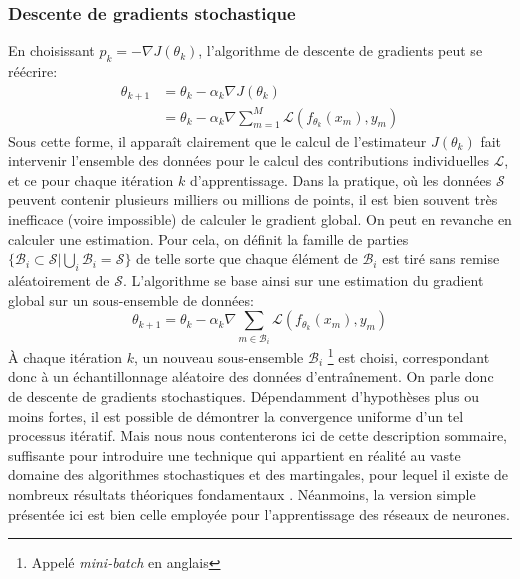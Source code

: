 \subsubsection{Descente de gradients stochastique}
En choisissant $p_k = -\nabla J(\theta_k)$, l'algorithme de descente de gradients peut se réécrire:
\begin{align}
	\theta_{k+1} &= \theta_{k} - \alpha_k \nabla J(\theta_k) \\
	&= \theta_{k} - \alpha_k \nabla \sum_{m=1}^{M} \mathcal{L}(f_{\theta_k}(x_m), y_m)
\end{align}
Sous cette forme, il apparaît clairement que le calcul de l'estimateur $J(\theta_k)$ fait intervenir l'ensemble des données pour le calcul des contributions individuelles $\mathcal{L}$, et ce pour chaque itération $k$ d'apprentissage. Dans la pratique, où les données $\mathcal{S}$ peuvent contenir plusieurs milliers ou millions de points, il est bien souvent très inefficace (voire impossible) de calculer le gradient global. On peut en revanche en calculer une estimation. Pour cela, on définit la famille de parties $\{\mathcal{B}_i \subset \mathcal{S} | \bigcup_i \mathcal{B}_i = \mathcal{S} \} $ de telle sorte que chaque élément de $\mathcal{B}_i$ est tiré sans remise aléatoirement de $\mathcal{S}$. L'algorithme se base ainsi sur une estimation du gradient global sur un sous-ensemble de données:
\begin{equation}
	\theta_{k+1} = \theta_{k} - \alpha_k \nabla \sum_{m \in \mathcal{B}_i}\mathcal{L}(f_{\theta_k}(x_m), y_m)
\end{equation} 
À chaque itération $k$, un nouveau sous-ensemble $\mathcal{B}_i$ \footnote{Appelé \textit{mini-batch} en anglais} est choisi, correspondant donc à un échantillonnage aléatoire des données d'entraînement. On parle donc de descente de gradients stochastiques. Dépendamment d'hypothèses plus ou moins fortes, il est possible de démontrer la convergence uniforme d'un tel processus itératif. Mais nous nous contenterons ici de cette description sommaire, suffisante pour introduire une technique qui appartient en réalité au vaste domaine des algorithmes stochastiques et des martingales, pour lequel il existe de nombreux résultats théoriques fondamentaux \cite{godichon-baggioniAlgorithmesStochastiques}. Néanmoins, la version simple présentée ici est bien celle employée pour l'apprentissage des réseaux de neurones.
